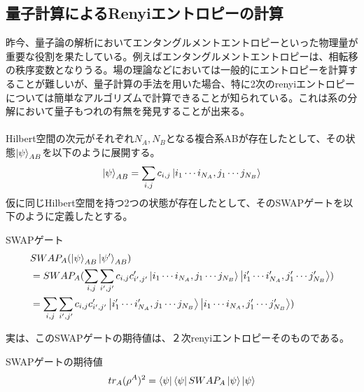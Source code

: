 \documentclass[a4paper,10.5pt]{article}
\numberwithin{equation}{section}
\begin{document}
\subsection{量子計算によるRenyiエントロピーの計算}
昨今、量子論の解析においてエンタングルメントエントロピーといった物理量が重要な役割を果たしている。例えばエンタングルメントエントロピーは、相転移の秩序変数となりうる。場の理論などにおいては一般的にエントロピーを計算することが難しいが、量子計算の手法を用いた場合、特に2次のrenyiエントロピーについては簡単なアルゴリズムで計算できることが知られている。これは系の分解において量子もつれの有無を発見することが出来る。\\
\\
Hilbert空間の次元がそれぞれ$N_{A},N_{B}$となる複合系ABが存在したとして、その状態$\ket{\psi}_{AB}$を以下のように展開する。
\begin{equation}\begin{split}
    \ket{\psi}_{AB}=\sum_{i,j}c_{i,j}\ket{i_{1}\cdots i_{N_{A}},j_{1}\cdots j_{N_{B}}}
\end{split} \end{equation}
仮に同じHilbert空間を持つ2つの状態が存在したとして、そのSWAPゲートを以下のように定義したとする。
\begin{defbox}{SWAPゲート}
\begin{equation}\begin{split}
    &SWAP_{A}(\ket{\psi}_{AB}\ket{\psi'}_{AB})\\
    &=SWAP_{A}(\sum_{i,j}\sum_{i',j'}c_{i,j}c'_{i',j'}\ket{i_{1}\cdots i_{N_{A}},j_{1}\cdots j_{N_{B}}}\ket{i'_{1}\cdots i'_{N_{A}},j'_{1}\cdots j'_{N_{B}}})\\
    &=\sum_{i,j}\sum_{i',j'}c_{i,j}c'_{i',j'}\ket{i'_{1}\cdots i'_{N_{A}},j_{1}\cdots j_{N_{B}}}\ket{i_{1}\cdots i_{N_{A}},j'_{1}\cdots j'_{N_{B}}})
\end{split} \end{equation}
\end{defbox}
実は、このSWAPゲートの期待値は、２次renyiエントロピーそのものである。
\begin{resultbox}{SWAPゲートの期待値}
\begin{equation}\begin{split}
    tr_{A}(\rho^{A})^{2}=\bra{\psi}\bra{\psi}SWAP_{A}\ket{\psi}\ket{\psi}
\end{split} \end{equation}
\end{resultbox}
\end{document}
